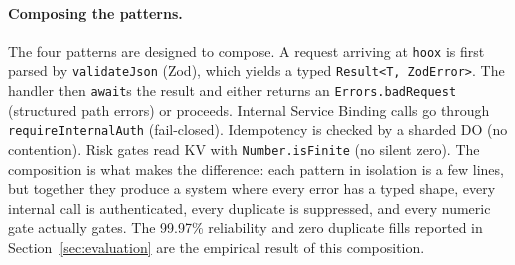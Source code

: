 \paragraph{Composing the patterns.}
The four patterns are designed to compose. A request arriving at \texttt{hoox} is first parsed by \texttt{validateJson} (Zod), which yields a typed \texttt{Result<T, ZodError>}. The handler then \texttt{await}s the result and either returns an \texttt{Errors.badRequest} (structured path errors) or proceeds. Internal Service Binding calls go through \texttt{requireInternalAuth} (fail-closed). Idempotency is checked by a sharded DO (no contention). Risk gates read KV with \texttt{Number.isFinite} (no silent zero). The composition is what makes the difference: each pattern in isolation is a few lines, but together they produce a system where every error has a typed shape, every internal call is authenticated, every duplicate is suppressed, and every numeric gate actually gates. The 99.97\% reliability and zero duplicate fills reported in Section~\ref{sec:evaluation} are the empirical result of this composition.

